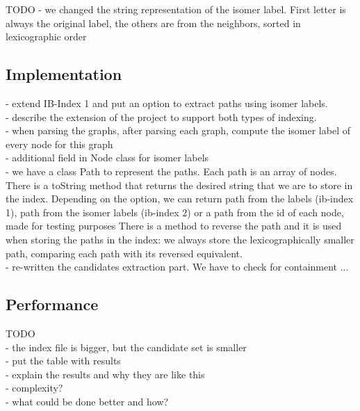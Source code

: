 \documentclass{l4proj}
\begin{document}
TODO
  - we changed the string representation of the isomer label. First letter is always the original label, the others are from the neighbors, sorted in lexicographic order\\

\subsection{Implementation}
       
       - extend IB-Index 1 and put an option to extract paths using isomer labels.\\
       - describe the extension of the project to support both types of indexing.\\
       - when parsing the graphs, after parsing each graph, compute the isomer label of every node for this graph\\
       - additional field in Node class for isomer labels\\
       - we have a class Path to represent the paths. Each path is an array of nodes. There is a toString method that returns the desired string that we are to store in the index. Depending on the option, we can return path from the labels (ib-index 1), path from the isomer labels (ib-index 2) or a path from the id of each node, made for testing purposes There is a method to reverse the path and it is used when storing the paths in the index: we always store the lexicographically smaller path, comparing each path with its reversed equivalent.\\
       - re-written the candidates extraction part. We have to check for containment ... \\
\subsection{Performance}
TODO \\
       - the index file is bigger, but the candidate set is smaller\\
       - put the table with results\\
       - explain the results and why they are like this\\
	   - complexity?\\
 	   - what could be done better and how?\\
\end{document}
